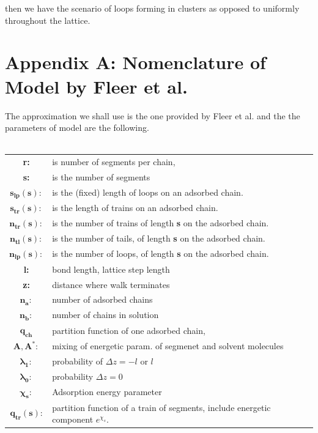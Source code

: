 \documentclass[10pt,letterpaper]{article}
\begin{document}
\noindent then we have the scenario of loops forming in clusters as opposed to uniformly throughout the lattice.



 






\newpage
\section*{Appendix A: Nomenclature of Model by Fleer et al.}
The approximation we shall use is the one provided by Fleer et al.\cite{fleer1993polymers} and the the parameters of model are the following.\\\\
%
\begin{tabular}{c|l}
\hline
\textbf{r:} & is number of segments per chain,\\
\textbf{s:} & is the number of segments \\ 
$\mathbf{s_{lp}(s):}$ &is the (fixed) length of loops on an adsorbed chain.\\
$\mathbf{s_{tr}(s):}$ &is the length of trains on an adsorbed chain.\\
$\mathbf{n_{tr}(s):}$ & is the number of trains of length \textbf{s}  on the adsorbed chain.\\
$\mathbf{n_{tl}(s):}$ &is the number of tails, of length \textbf{s}  on the adsorbed chain.\\
$\mathbf{n_{lp}(s):}$ &is the number of loops, of length \textbf{s}  on the adsorbed chain.\\
\textbf{l:}&bond length, lattice step length\\
\textbf{z:}&distance where walk terminates\\
$\mathbf{n_a:}$ &number of adsorbed chains\\
$\mathbf{n_b:}$&number of chains in solution\\
$\mathbf{q_{ch}}$&partition function of one adsorbed chain,\\
$\mathbf{A,A^{*}:}$& mixing of energetic param. of segmenet and solvent molecules\footnotemark \\
$\mathbf{\lambda_1:}$&probability of $\Delta z=-l$ or $l$\\
$\mathbf{\lambda_0:}$ &probability $\Delta z=0$\\
$\mathbf{\chi_{s}:}$ &Adsorption energy parameter\\
$\mathbf{q_{tr}(s)}$: & partition function of a train of segments, include energetic component $e^{\chi_s}$.\\

\end{tabular}
\end{document}
